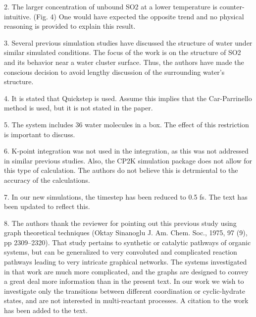 2.	The larger concentration of unbound SO2 at a lower temperature is counter-intuitive. (Fig. 4) One would have expected the opposite trend and no physical reasoning is provided to explain this result. 

3. Several previous simulation studies have discussed the structure of water under similar simulated conditions. The focus of the work is on the structure of SO2 and its behavior near a water cluster surface. Thus, the authors have made the conscious decision to avoid lengthy discussion of the surrounding water's structure.

4.	It is stated that Quickstep is used. Assume this implies that the Car-Parrinello method is used, but it is not stated in the paper. 

5.	The system includes 36 water molecules in a box. The effect of this restriction is important to discuss. 

6. K-point integration was not used in the integration, as this was not addressed in similar previous studies. Also, the CP2K simulation package does not allow for this type of calculation. The authors do not believe this is detrmiental to the accuracy of the calculations.

7. In our new simulations, the timestep has been reduced to 0.5 fs. The text has been updated to reflect this.

8. The authors thank the reviewer for pointing out this previous study using graph theoretical techniques (Oktay Sinanoglu J. Am. Chem. Soc., 1975, 97 (9), pp 2309–2320). That study pertains to synthetic or catalytic pathways of organic systems, but can be generalized to very convoluted and complicated reaction pathways leading to very intricate graphical networks. The systems investigated in that work are much more complicated, and the graphs are designed to convey a great deal more information than in the present text. In our work we wish to investigate only the transitions between different coordination or cyclic-hydrate states, and are not interested in multi-reactant processes. A citation to the work has been added to the text.

